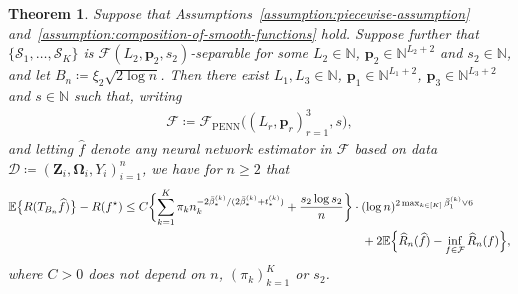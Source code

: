 \documentclass[12pt]{article}
\newcommand{\red}[1]{\textcolor{red}{#1}}
\newtheorem{thm}{Theorem}
\def\hat{\widehat}
\begin{document}
\begin{thm} \label{thm:PENN-ub}
    Suppose that Assumptions~\ref{assumption:piecewise-assumption} and~\ref{assumption:composition-of-smooth-functions} hold.  Suppose further that $\{\mathcal{S}_1,\ldots,\mathcal{S}_K\}$ is $\mathcal{F}(L_2,\bm p_2,s_2)$-separable for some $L_2\in\mathbb{N}$, $\bm p_2 \in \mathbb{N}^{L_2+2}$ and $s_2\in\mathbb{N}$, and let $B_n \coloneqq \xi_2\sqrt{2\log n}$.  Then there exist $L_1,L_3 \in \mathbb{N}$, $\bm p_1 \in \mathbb{N}^{L_1+2}$, $\bm p_3 \in \mathbb{N}^{L_3+2}$ and $s \in \mathbb{N}$ such that, writing 
    \begin{align*}
        \mathcal{F} \coloneqq \mathcal{F}_{\mathrm{PENN}}\bigl((L_r,\bm{p}_r)_{r=1}^3,s\bigr),
    \end{align*}
    and letting $\hat{f}$ denote any neural network estimator in $\mathcal{F}$ based on data $\mathcal{D} \coloneqq (\bm Z_i,\bm\Omega_i,Y_i)_{i=1}^n$, we have for $n \geq 2$ that
    \begin{align*}
        \mathbb{E}\bigl\{ R(T_{B_n}\hat{f})\bigr\} - R(f^{\star}) &\leq C \biggl\{\sum_{k=1}^K \pi_k n_k^{-2\bar\beta^{(k)}_*/(2\bar\beta^{(k)}_* + t^{(k)}_*)} + \frac{s_2\log s_2}{n}\biggr\} \cdot (\log n)^{2\max_{k\in[K]} \bar{\beta}^{(k)}_1 \vee 6}\\
        &\hspace{7cm} + 2\mathbb{E}\Bigl\{\hat{R}_n(\hat{f}) - \inf_{f\in\mathcal{F}} \hat{R}_n(f) \Bigr\},
    \end{align*}
    where $C>0$ does not depend on $n$, $(\pi_k)_{k=1}^K$ or $s_2$. %
\end{thm}    
\end{document}
